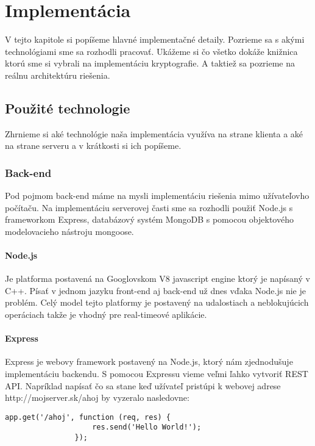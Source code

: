 \chapter{Implementácia}
	V tejto kapitole si popíšeme hlavné implementačné detaily. Pozrieme sa s akými technológiami sme sa rozhodli pracovať. Ukážeme si čo všetko dokáže knižnica ktorú sme si vybrali na implementáciu kryptografie. A taktiež sa pozrieme na reálnu architektúru riešenia.
	
\section{Použité technologie}
	Zhrnieme si aké technológie naša implementácia využíva na strane klienta a aké na strane serveru a v krátkosti si ich popíšeme.
	\subsection{Back-end}
		Pod pojmom back-end máme na mysli implementáciu riešenia mimo užívateľovho počítaču. Na implementáciu serverovej časti sme sa rozhodli použiť Node.js s frameworkom Express, databázový systém MongoDB s pomocou objektového modelovacieho nástroju mongoose.
		\\
		\subsubsection{Node.js}
			Je platforma postavená na Googlovskom V8 javascript engine ktorý je napísaný v C++. Písať v jednom jazyku front-end aj back-end už dnes vďaka Node.js nie je problém. Celý model tejto platformy je postavený na udalostiach a neblokujúcich operáciach takže je vhodný pre real-timeové aplikácie.
		\subsubsection{Express}
			Express je webovy framework postavený na Node.js, ktorý nám zjednodušuje implementáciu backendu. S pomocou Expressu vieme veľmi ľahko vytvoriť REST API. Napríklad napísať čo sa stane keď užívateľ pristúpi k webovej adrese http://mojserver.sk/ahoj by vyzeralo nasledovne:
			\medskip
			\begin{lstlisting}[caption=Express routing]
				app.get('/ahoj', function (req, res) {
					res.send('Hello World!');
				});			
			\end{lstlisting}
